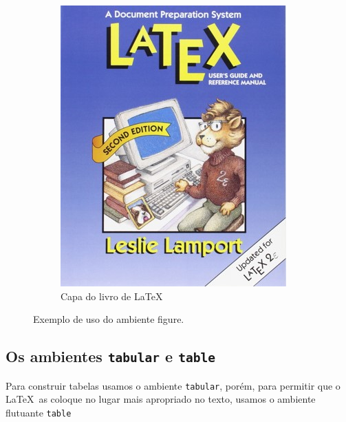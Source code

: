 \begin{figure}[hbt]
    \begin{LTXexample}[pos=b]
    \begin{figure}
    \centering
    \includegraphics[height=0.3\textheight]{Images/Picture6}
    \caption{Capa do livro de \LaTeX\ }
    \label{fig:picture6}
\end{figure}
    \end{LTXexample}
    \caption{Exemplo de uso do ambiente figure.}
    \label{fig:fig}
\end{figure}

\subsection{Os ambientes \lstinline|tabular| e \lstinline|table|}

Para construir tabelas usamos o ambiente \lstinline|tabular|, porém, para permitir que o \LaTeX\ as coloque no lugar mais apropriado no texto, usamos o ambiente flutuante \lstinline|table|

